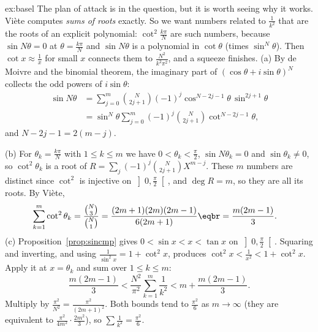 \begin{solution}{ex:basel}
\idea The plan of attack is in the question, but it is worth seeing why it works. Vi\`ete computes \emph{sums of roots} exactly. So we want numbers related to $\frac1{k^2}$ that are the roots of an explicit polynomial: $\cot^2\frac{k\pi}N$ are such numbers, because $\sin N\theta=0$ at $\theta=\frac{k\pi}N$ and $\sin N\theta$ is a polynomial in $\cot\theta$ (times $\sin^N\theta$). Then $\cot x\approx\frac1x$ for small $x$ connects them to $\frac{N^2}{k^2\pi^2}$, and a squeeze finishes.
\writeup (a) By de Moivre and the binomial theorem, the imaginary part of $(\cos\theta+i\sin\theta)^N$ collects the odd powers of $i\sin\theta$:
\[
\begin{aligned}\sin N\theta&=\sum_{j=0}^m\binom N{2j+1}(-1)^j\cos^{N-2j-1}\theta\,\sin^{2j+1}\theta\\
&=\sin^N\theta\sum_{j=0}^m(-1)^j\binom N{2j+1}\cot^{N-2j-1}\theta,\end{aligned}
\]
and $N-2j-1=2(m-j)$.

(b) For $\theta_k=\frac{k\pi}N$ with $1\le k\le m$ we have $0<\theta_k<\frac\pi2$, $\sin N\theta_k=0$ and $\sin\theta_k\ne0$, so $\cot^2\theta_k$ is a root of
$R=\sum_j(-1)^j\binom N{2j+1}X^{m-j}$. These $m$ numbers are distinct since $\cot^2$ is injective on $\left]0,\frac\pi2\right[$, and $\deg R=m$, so they are all its roots.
By Vi\`ete,
\[
\begin{aligned}\sum_{k=1}^m\cot^2\theta_k&=\frac{\binom N3}{\binom N1}=\frac{(2m+1)(2m)(2m-1)}{6(2m+1)}\eqbr=\frac{m(2m-1)}3.\end{aligned}
\]
(c) Proposition~\ref{prop:sincmp} gives $0<\sin x<x<\tan x$ on $\left]0,\frac\pi2\right[$. Squaring and inverting, and using $\frac1{\sin^2x}=1+\cot^2x$, produces $\cot^2x<\frac1{x^2}<1+\cot^2x$.
Apply it at $x=\theta_k$ and sum over $1\le k\le m$:
\[
\frac{m(2m-1)}3<\frac{N^2}{\pi^2}\sum_{k=1}^m\frac1{k^2}<m+\frac{m(2m-1)}3.
\]
Multiply by $\frac{\pi^2}{N^2}=\frac{\pi^2}{(2m+1)^2}$. Both bounds tend to $\frac{\pi^2}6$ as $m\to\infty$ (they are equivalent to $\frac{\pi^2}{4m^2}\cdot\frac{2m^2}3$), so $\sum\frac1{k^2}=\frac{\pi^2}6$.
\end{solution}

